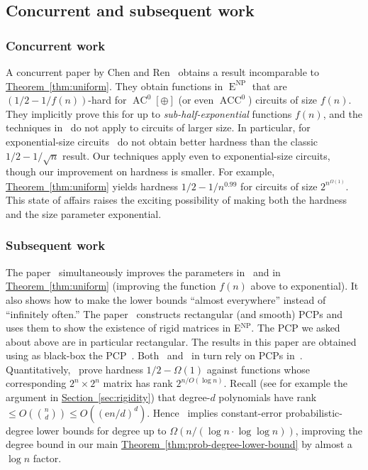 \documentclass[11pt]{article}
\newcommand{\expref}[2]{\texorpdfstring{\hyperref[#2]{#1~\ref{#2}}}{#1~\ref{#2}}}
\newcommand{\eee}{\mathrm e}
\DeclareMathOperator{\AC}{\mathrm{AC}}  %
\DeclareMathOperator{\ACC}{\mathrm{ACC}}  %
\DeclareMathOperator{\NP}{\mathrm{NP}}  %
\DeclareMathOperator{\EEE}{\mathrm{E}}  %
\begin{document}
\subsection{Concurrent and subsequent work}

\subsubsection{Concurrent work}

A concurrent paper by Chen and Ren~\cite{ChenRen20} obtains a result
incomparable to \expref{Theorem}{thm:uniform}. They obtain functions
in $\EEE^{\NP}$ that are $(1/2-1/f(n))$-hard for $\AC^{0}[\oplus]$ (or
even $\ACC^{0}$) circuits of size $f(n)$. They implicitly prove this
for up to \emph{sub-half-exponential }functions $f(n)$, and the techniques
in~\cite{ChenRen20} do not apply to circuits of larger size. In particular,
for exponential-size circuits~\cite{ChenRen20} do not obtain better
hardness than the classic $1/2-1/\sqrt{n}$ result. Our techniques
apply even to exponential-size circuits, though our improvement on
hardness is smaller. For example, \expref{Theorem}{thm:uniform} yields
hardness $1/2-1/n^{0.99}$ for circuits of size $2^{n^{\Omega(1)}}$.
This state of affairs raises the exciting possibility of making both
the hardness and the size parameter exponential.

\subsubsection{Subsequent work}

The paper~\cite{ChenLW2020-almost} simultaneously improves the parameters
in~\cite{ChenRen20} and in \expref{Theorem}{thm:uniform} (improving
the function $f(n)$ above to exponential). It also shows how to make
the lower bounds ``almost everywhere'' instead of ``infinitely
often.'' The paper~\cite{DBLP:journals/corr/abs-2005-03123} constructs
rectangular (and smooth) PCPs and uses them to show the existence
of rigid matrices in E$^{\NP}$. The PCP we asked about above are in
particular rectangular. The results in this paper are obtained using
as black-box the PCP~\cite{Ben-SassonV-AC0PCP}. Both~\cite{DBLP:journals/corr/abs-2005-03123}
and~\cite{Ben-SassonV-AC0PCP} in turn rely on PCPs in~\cite{Ben-SassonGHSV05}.
Quantitatively,~\cite{DBLP:journals/corr/abs-2005-03123} prove hardness
$1/2-\Omega(1)$ against functions whose corresponding $2^{n}\times2^{n}$
matrix has rank $2^{n/O(\log n)}$. Recall
%
(see for example the argument in \expref{Section}{sec:rigidity}) %
that degree-$d$ polynomials have rank $\le O(\binom{n}{d})\le O((\eee n/d)^{d})$.
Hence~\cite{DBLP:journals/corr/abs-2005-03123} implies constant-error
probabilistic-degree lower bounds for degree up to $\Omega(n/(\log n\cdot\log\log n))$,
improving the degree bound in our main \expref{Theorem}{thm:prob-degree-lower-bound}
by almost a $\log n$ factor.
\end{document}
